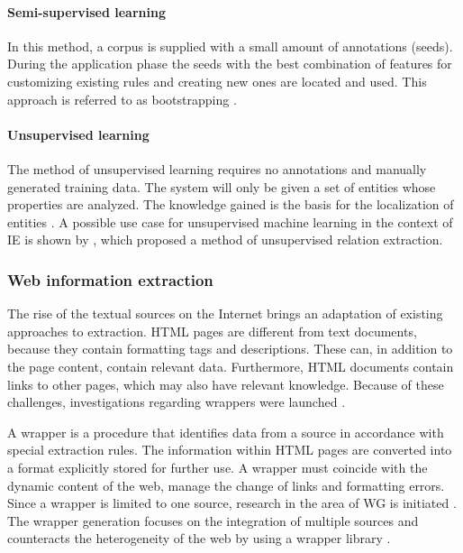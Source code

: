 \paragraph{Semi-supervised learning}
In this method, a corpus is supplied with a small amount of annotations (seeds). During the application phase the seeds with the best combination of features for customizing existing rules and creating new ones are located and used. This approach is referred to as bootstrapping \cite{Carstensen:2010}\cite{Chang:2006}.

\paragraph{Unsupervised learning}
The method of unsupervised learning requires no annotations and manually generated training data. The system will only be given a set of entities whose properties are analyzed. The knowledge gained is the basis for the localization of entities \cite{Carstensen:2010}\cite{Schramm:2008}. A possible use case for unsupervised machine learning in the context of \gls{IE} is shown by \cite{Akbik:2012}, which proposed a method of unsupervised relation extraction.

\subsubsection{Web information extraction}
The rise of the textual sources on the Internet brings an adaptation of existing approaches to extraction. HTML pages are different from text documents, because they contain formatting tags and descriptions. These can, in addition to the page content, contain relevant data. Furthermore, HTML documents contain links to other pages, which may also have relevant knowledge. Because of these challenges, investigations regarding wrappers were launched  \cite{Eikvil:1999}\cite{Freitag:2000}\cite{Linsmayr:2010}.

A wrapper is a procedure that identifies data from a source in accordance with special extraction rules. The information within HTML pages are converted into a format explicitly stored for further use. A wrapper must coincide with the dynamic content of the web, manage the change of links and formatting errors. Since a wrapper is limited to one source, research in the area of \gls{WG} is initiated \cite{Chang:2006}\cite{Eikvil:1999}. The wrapper generation focuses on the integration of multiple sources and counteracts the heterogeneity of the web by using a wrapper library \cite{Siefkes:2007}\cite{Turmo:2006}.

